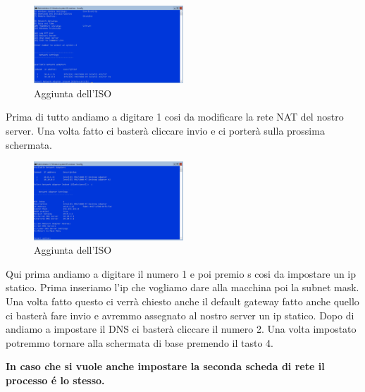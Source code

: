 \documentclass[../main.tex]{subfiles}
\begin{document}
\begin{figure}[h]
    \centering
    \includegraphics[width=0.5\textwidth]{Images/coreConf3.PNG}
    \caption{Aggiunta dell'ISO}
\end{figure}

Prima di tutto andiamo a digitare 1 cosi da modificare la rete NAT del nostro server. Una volta fatto ci basterà cliccare invio e ci porterà sulla prossima schermata.

\begin{figure}[h]
    \centering
    \includegraphics[width=0.5\textwidth]{Images/coreConf4.PNG}
    \caption{Aggiunta dell'ISO}
\end{figure}
Qui prima andiamo a digitare il numero 1 e poi premio s cosi da impostare un ip statico. Prima inseriamo l'ip che vogliamo dare alla macchina poi la subnet mask. Una volta fatto questo ci verrà chiesto anche il default gateway fatto anche quello ci basterà fare invio e avremmo assegnato al nostro server un ip statico. Dopo di andiamo a impostare il DNS ci basterà cliccare il numero 2. Una volta impostato potremmo tornare alla schermata di base premendo il tasto 4.


\textbf{In caso che si vuole anche impostare la seconda scheda di rete il processo é lo stesso.}
\end{document}
